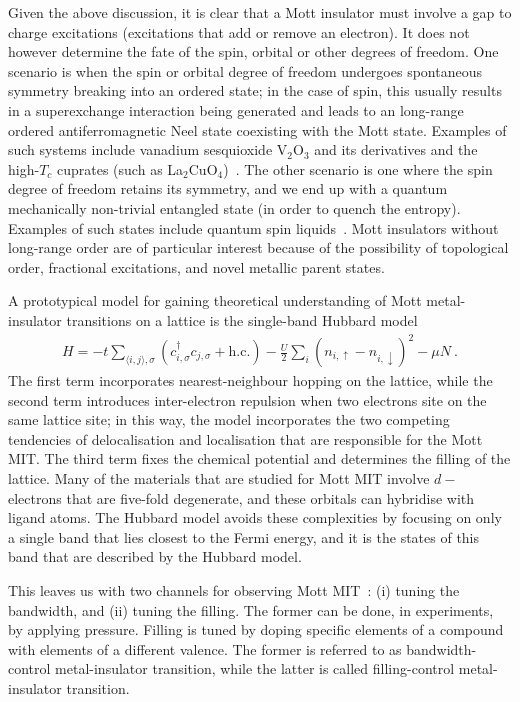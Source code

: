 Given the above discussion, it is clear that a Mott insulator must involve a gap to charge excitations (excitations that add or remove an electron). It does not however determine the fate of the spin, orbital or other degrees of freedom. One scenario is when the spin or orbital degree of freedom undergoes spontaneous symmetry breaking into an ordered state; in the case of spin, this usually results in a superexchange interaction being generated and leads to an long-range ordered antiferromagnetic Neel state coexisting with the Mott state. Examples of such systems include vanadium sesquioxide V$_2$O$_3$ and its derivatives and the high-\(T_c\) cuprates (such as La$_2$CuO$_4$)~\cite{imada1998metal}. The other scenario is one where the spin degree of freedom retains its symmetry, and we end up with a quantum mechanically non-trivial entangled state (in order to quench the entropy). Examples of such states include quantum spin liquids~\cite{Isono2016}. Mott insulators without long-range order are of particular interest because of the possibility of topological order, fractional excitations, and novel metallic parent states.

A prototypical model for gaining theoretical understanding of Mott metal-insulator transitions on a lattice is the single-band Hubbard model~\cite{Anderson1959,hubbard1963electron,kanamori_1963,gutzwiller_1963}
\begin{equation}\begin{aligned}\label{hubbardModel}
	H = -t\sum_{\langle i,j \rangle , \sigma}(c^\dagger_{i,\sigma}c_{j,\sigma} + \text{h.c.}) - \frac{U}{2}\sum_i (n_{i, \uparrow} - n_{i, \downarrow})^2 - \mu N~.
\end{aligned}\end{equation}
The first term incorporates nearest-neighbour hopping on the lattice, while the second term introduces inter-electron repulsion when two electrons site on the same lattice site; in this way, the model incorporates the two competing tendencies of delocalisation and localisation that are responsible for the Mott MIT. The third term fixes the chemical potential and determines the filling of the lattice. Many of the materials that are studied for Mott MIT involve \(d-\)electrons that are five-fold degenerate, and these orbitals can hybridise with ligand atoms. The Hubbard model avoids these complexities by focusing on only a single band that lies closest to the Fermi energy, and it is the states of this band that are described by the Hubbard model.

This leaves us with two channels for observing Mott MIT~\cite{imada1998metal}: (i) tuning the bandwidth, and (ii) tuning the filling. The former can be done, in experiments, by applying pressure. Filling is tuned by doping specific elements of a compound with elements of a different valence. The former is referred to as bandwidth-control metal-insulator transition, while the latter is called filling-control metal-insulator transition.

